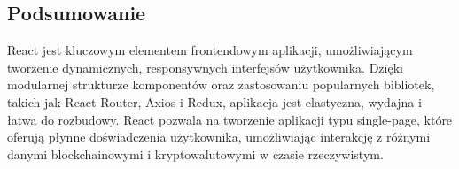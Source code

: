 \subsection{Podsumowanie}

React jest kluczowym elementem frontendowym aplikacji, umożliwiającym tworzenie dynamicznych, responsywnych interfejsów użytkownika. Dzięki modularnej strukturze komponentów oraz zastosowaniu popularnych bibliotek, takich jak React Router, Axios i Redux, aplikacja jest elastyczna, wydajna i łatwa do rozbudowy. React pozwala na tworzenie aplikacji typu single-page, które oferują płynne doświadczenia użytkownika, umożliwiając interakcję z różnymi danymi blockchainowymi i kryptowalutowymi w czasie rzeczywistym.
